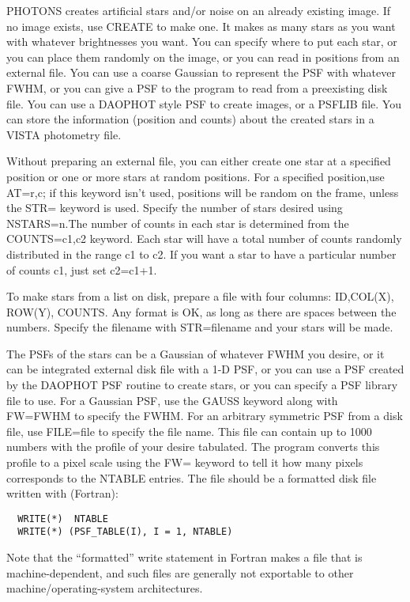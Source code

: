PHOTONS creates artificial stars and/or noise on an already existing
image. If no image exists, use CREATE to make one. It makes as many stars
as you want with whatever brightnesses you want. You can specify where to
put each star, or you can place them randomly on the image, or you can read
in positions from an external file. You can use a coarse Gaussian to
represent the PSF with whatever FWHM, or you can give a PSF to the program
to read from a preexisting disk file. You can use a DAOPHOT style PSF to
create images, or a PSFLIB file. You can store the information (position
and counts) about the created stars in a VISTA photometry file.

Without preparing an external file, you can either create one star at a
specified position or one or more stars at random positions. For a
specified position,use AT=r,c; if this keyword isn't used, positions will
be random on the frame, unless the STR= keyword is used. Specify the number
of stars desired using NSTARS=n.The number of counts in each star is
determined from the COUNTS=c1,c2 keyword. Each star will have a total
number of counts randomly distributed in the range c1 to c2. If you want a
star to have a particular number of counts c1, just set c2=c1+1.

To make stars from a list on disk, prepare a file with four columns:
ID,COL(X), ROW(Y), COUNTS.  Any format is OK, as long as there are spaces
between the numbers. Specify the filename with STR=filename and your stars
will be made.

The PSFs of the stars can be a Gaussian of whatever FWHM you desire, or it
can be integrated external disk file with a 1-D PSF, or you can use a PSF
created by the DAOPHOT PSF routine to create stars, or you can specify a
PSF library file to use. For a Gaussian PSF, use the GAUSS keyword along
with FW=FWHM to specify the FWHM. For an arbitrary symmetric PSF from a
disk file, use FILE=file to specify the file name. This file can contain up
to 1000 numbers with the profile of your desire tabulated. The program
converts this profile to a pixel scale using the FW= keyword to tell it how
many pixels corresponds to the NTABLE entries. The file should be a
formatted disk file written with (Fortran):
\begin{verbatim}
  WRITE(*)  NTABLE
  WRITE(*) (PSF_TABLE(I), I = 1, NTABLE)
\end{verbatim}
Note that the ``formatted'' write statement in Fortran makes a file that is
machine-dependent, and such files are generally not exportable to other
machine/operating-system architectures.

